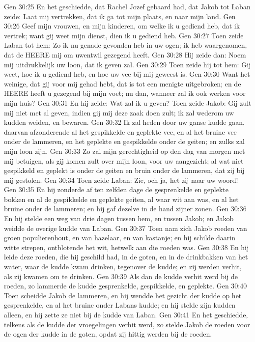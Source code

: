 Gen 30:25  En het geschiedde, dat Rachel Jozef gebaard had, dat Jakob tot Laban zeide: Laat mij vertrekken, dat ik ga tot mijn plaats, en naar mijn land.
Gen 30:26  Geef mijn vrouwen, en mijn kinderen, om welke ik u gediend heb, dat ik vertrek; want gij weet mijn dienst, dien ik u gediend heb.
Gen 30:27  Toen zeide Laban tot hem: Zo ik nu genade gevonden heb in uw ogen; ik heb waargenomen, dat de HEERE mij om uwentwil gezegend heeft.
Gen 30:28  Hij zeide dan: Noem mij uitdrukkelijk uw loon, dat ik geven zal.
Gen 30:29  Toen zeide hij tot hem: Gij weet, hoe ik u gediend heb, en hoe uw vee bij mij geweest is.
Gen 30:30  Want het weinige, dat gij voor mij gehad hebt, dat is tot een menigte uitgebroken; en de HEERE heeft u gezegend bij mijn voet; nu dan, wanneer zal ik ook werken voor mijn huis?
Gen 30:31  En hij zeide: Wat zal ik u geven? Toen zeide Jakob: Gij zult mij niet met al geven, indien gij mij deze zaak doen zult; ik zal wederom uw kudden weiden, en bewaren.
Gen 30:32  Ik zal heden door uw ganse kudde gaan, daarvan afzonderende al het gespikkelde en geplekte vee, en al het bruine vee onder de lammeren, en het geplekte en gespikkelde onder de geiten; en zulks zal mijn loon zijn.
Gen 30:33  Zo zal mijn gerechtigheid op den dag van morgen met mij betuigen, als gij komen zult over mijn loon, voor uw aangezicht; al wat niet gespikkeld en geplekt is onder de geiten en bruin onder de lammeren, dat zij bij mij gestolen.
Gen 30:34  Toen zeide Laban: Zie, och ja, het zij naar uw woord!
Gen 30:35  En hij zonderde af ten zelfden dage de gesprenkelde en geplekte bokken en al de gespikkelde en geplekte geiten, al waar wit aan was, en al het bruine onder de lammeren; en hij gaf dezelve in de hand zijner zonen.
Gen 30:36  En hij stelde een weg van drie dagen tussen hem, en tussen Jakob; en Jakob weidde de overige kudde van Laban.
Gen 30:37  Toen nam zich Jakob roeden van groen populierenhout, en van hazelaar, en van kastanje; en hij schilde daarin witte strepen, ontblotende het wit, hetwelk aan die roeden was.
Gen 30:38  En hij leide deze roeden, die hij geschild had, in de goten, en in de drinkbakken van het water, waar de kudde kwam drinken, tegenover de kudde; en zij werden verhit, als zij kwamen om te drinken.
Gen 30:39  Als dan de kudde verhit werd bij de roeden, zo lammerde de kudde gesprenkelde, gespikkelde, en geplekte.
Gen 30:40  Toen scheidde Jakob de lammeren, en hij wendde het gezicht der kudde op het gesprenkelde, en al het bruine onder Labans kudde; en hij stelde zijn kudden alleen, en hij zette ze niet bij de kudde van Laban.
Gen 30:41  En het geschiedde, telkens als de kudde der vroegelingen verhit werd, zo stelde Jakob de roeden voor de ogen der kudde in de goten, opdat zij hittig werden bij de roeden.
